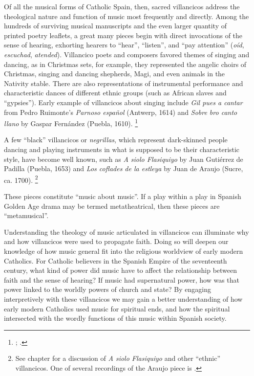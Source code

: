 \documentclass[oneside,12pt]{book}
\begin{document}
    Of all the musical forms of Catholic Spain, then, sacred villancicos address the theological nature and function of music most frequently and directly.
    Among the hundreds of surviving musical manuscripts and the even larger quantity of printed poetry leaflets, a great many pieces begin with direct invocations of the sense of hearing, exhorting hearers to \enquote{hear}, \enquote{listen}, and \enquote{pay attention} (\emph{oíd}, \emph{escuchad}, \emph{atended}).
    Villancico poets and composers favored themes of singing and dancing, as in Christmas sets, for example, they represented the angelic choirs of Christmas, singing and dancing shepherds, Magi, and even animals in the Nativity stable.
    There are also representations of instrumental performance and characteristic dances of different ethnic groups (such as African slaves and \enquote{gypsies}).
    Early example of villancicos about singing include \emph{Gil pues a cantar} from Pedro Ruimonte’s \emph{Parnoso español} (Antwerp, 1614) and \emph{Sobre bro canto llano} by Gaspar Fernández (Puebla, 1610).%
\footnote{\autocite{Ruimonte_Rimonte_1980};
    \autocite{Fernandes2001}.
    }

    A few \enquote{black} villancicos or \emph{negrillas}, which represent dark-skinned people dancing and playing instruments in what is supposed to be their characteristic style, have become well known, such as \emph{A siolo Flasiquiyo} by Juan Gutiérrez de Padilla (Puebla, 1653) and \emph{Los coflades de la estleya} by Juan de Araujo (Sucre, ca. 1700).%
\footnote{
    See chapter \autocite{chapter:Puebla} for a discussion of \emph{A siolo Flasiquiyo} and other \enquote{ethnic} villancicos.
      One of several recordings of the Araujo piece is \autocite{Skidmore2003}.
    }

    These pieces constitute \enquote{music about music}.
    If a play within a play in Spanish Golden Age drama may be termed metatheatrical, then these pieces are \enquote{metamusical}.
  
    Understanding the theology of music articulated in villancicos can illuminate why and how villancicos were used to propagate faith.
    Doing so will deepen our knowledge of how music general fit into the religious worldview of early modern Catholics.
    For Catholic believers in the Spanish Empire of the seventeenth century, what kind of power did music have to affect the relationship between faith and the sense of hearing?
    If music had supernatural power, how was that power linked to the worldly powers of church and state?
    By engaging interpretively with these villancicos we may gain a better understanding of how early modern Catholics used music for spiritual ends, and how the spiritual intersected with the wordly functions of this music within Spanish society.
  
\end{document}
